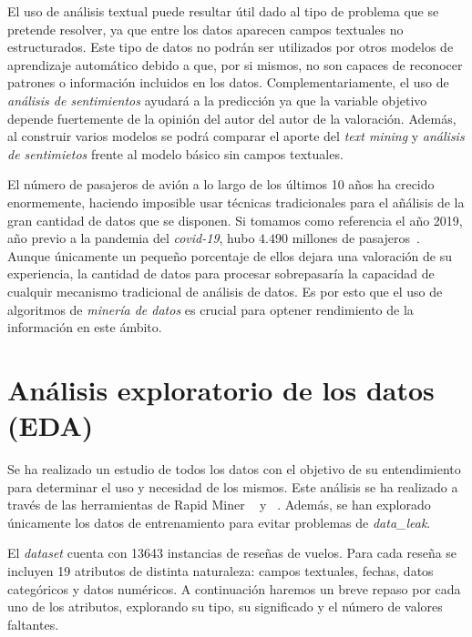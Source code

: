 \documentclass[12pt]{report} %
\begin{document}
El uso de análisis textual puede resultar útil dado al tipo de problema que se pretende resolver, ya que entre los datos aparecen campos textuales no estructurados. Este tipo de datos no podrán ser utilizados por otros modelos de aprendizaje automático debido a que, por si mismos, no son capaces de reconocer patrones o información incluidos en los datos. Complementariamente, el uso de \textit{análisis de sentimientos} ayudará a la predicción ya que la variable objetivo depende fuertemente de la opinión del autor del autor de la valoración. Además, al construir varios modelos se podrá comparar el aporte del \textit{text mining} y \textit{análisis de sentimietos} frente al modelo básico sin campos textuales.

El número de pasajeros de avión a lo largo de los últimos 10 años ha crecido enormemente, haciendo imposible usar técnicas tradicionales para el añálisis de la gran cantidad de datos que se disponen. Si tomamos como referencia el año 2019, año previo a la pandemia del \textit{covid-19}, hubo $4.490$ millones de pasajeros~\cite{owd-passengers}. Aunque únicamente un pequeño porcentaje de ellos dejara una valoración de su experiencia, la cantidad de datos para procesar sobrepasaría la capacidad de cualquir mecanismo tradicional de análisis de datos. Es por esto que el uso de algoritmos de \textit{minería de datos} es crucial para optener rendimiento de la información en este ámbito.




\chapter{Análisis exploratorio de los datos (EDA)}
\label{chap:eda}
Se ha realizado un estudio de todos los datos con el objetivo de su entendimiento para determinar el uso y necesidad de los mismos. Este análisis se ha realizado a través de las herramientas de Rapid Miner ~\cite{Statistics} y ~\cite{Correlation-Matrix}. Además, se han explorado únicamente los datos de entrenamiento para evitar problemas de \textit{data\_leak}. 

El \textit{dataset} cuenta con 13643 instancias de reseñas de vuelos. Para cada reseña se incluyen 19 atributos de distinta naturaleza: campos textuales, fechas, datos categóricos y datos numéricos. A continuación haremos un breve repaso por cada uno de los atributos, explorando su tipo, su significado y el número de valores faltantes.
\end{document}

